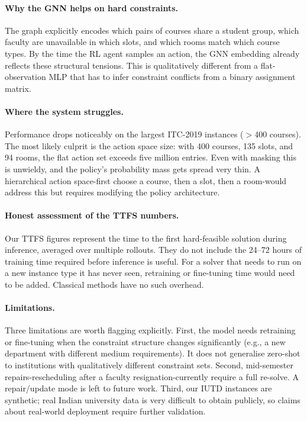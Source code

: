 \documentclass[conference]{IEEEtran}
\begin{document}
\paragraph{Why the GNN helps on hard constraints.}
The graph explicitly encodes which pairs of courses share a student group, which faculty are unavailable in which slots, and which rooms match which course types. By the time the RL agent samples an action, the GNN embedding already reflects these structural tensions. This is qualitatively different from a flat-observation MLP that has to infer constraint conflicts from a binary assignment matrix.

\paragraph{Where the system struggles.}
Performance drops noticeably on the largest ITC-2019 instances ($>$400 courses). The most likely culprit is the action space size: with 400 courses, 135 slots, and 94 rooms, the flat action set exceeds five million entries. Even with masking this is unwieldy, and the policy's probability mass gets spread very thin. A hierarchical action space-first choose a course, then a slot, then a room-would address this but requires modifying the policy architecture.

\paragraph{Honest assessment of the TTFS numbers.}
Our TTFS figures represent the time to the first hard-feasible solution during inference, averaged over multiple rollouts. They do not include the 24--72 hours of training time required before inference is useful. For a solver that needs to run on a new instance type it has never seen, retraining or fine-tuning time would need to be added. Classical methods have no such overhead.

\paragraph{Limitations.}
Three limitations are worth flagging explicitly. First, the model needs retraining or fine-tuning when the constraint structure changes significantly (e.g., a new department with different medium requirements). It does not generalise zero-shot to institutions with qualitatively different constraint sets. Second, mid-semester repairs-rescheduling after a faculty resignation-currently require a full re-solve. A repair/update mode is left to future work. Third, our IUTD instances are synthetic; real Indian university data is very difficult to obtain publicly, so claims about real-world deployment require further validation.
\end{document}
